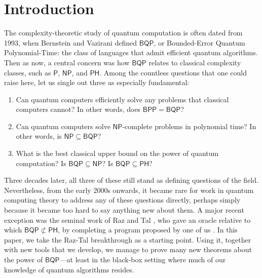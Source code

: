 \documentclass[11pt]{article}%
\begin{document}
\begin{abstract}
To achieve these results, we build on the 2018 achievement by Raz and Tal of an oracle relative to which $\mathsf{BQP}\not \subset \mathsf{PH}$, and associated results about the \textsc{Forrelation} problem.  We also introduce new tools that might be of independent interest. These include a ``quantum-aware'' version of the random restriction method, a concentration theorem for the block sensitivity of $\mathsf{AC^0}$ circuits, and a (provable) analogue of the Aaronson-Ambainis Conjecture for sparse oracles.
\end{abstract}
\newpage
\tableofcontents
\newpage

\section{Introduction\label{INTRO}}

The complexity-theoretic study of quantum computation is often dated from 1993, when Bernstein and Vazirani \cite{BV97} defined $\mathsf{BQP}$, or Bounded-Error Quantum Polynomial-Time: the class of languages that admit efficient quantum algorithms.  Then as now, a central concern was how $\mathsf{BQP}$ relates to classical complexity classes, such as $\mathsf{P}$, $\mathsf{NP}$, and $\mathsf{PH}$.  Among the countless questions that one could raise here, let us single out three as especially fundamental:
\begin{enumerate}[(1)]
\item Can quantum computers efficiently solve any problems that classical computers cannot?  In other words, does $\mathsf{BPP}= \mathsf{BQP}$?
\item Can quantum computers solve $\mathsf{NP}$-complete problems in polynomial time?  In other words, is $\mathsf{NP} \subseteq \mathsf{BQP}$?
\item What is the best classical upper bound on the power of quantum computation?  Is $\mathsf{BQP} \subseteq \mathsf{NP}$?  Is $\mathsf{BQP} \subseteq \mathsf{PH}$?
\end{enumerate}

Three decades later, all three of these still stand as defining
questions of the field.  Nevertheless, from the early 2000s onwards, it became rare for work in quantum computing theory to address any of these questions directly, perhaps simply because it became too hard to say anything new about them.  A major recent exception was the seminal work of Raz and Tal \cite{RT19}, who gave an oracle relative to which $\mathsf{BQP}\not\subset\mathsf{PH}$, by completing a program proposed by one of us \cite{Aar10}.  In this paper, we take the Raz-Tal breakthrough as a starting point.  Using it, together with new tools that we develop, we manage to prove many new theorems about the power of $\mathsf{BQP}$---at least in the black-box setting where much of our knowledge of quantum
algorithms resides.
\end{document}
